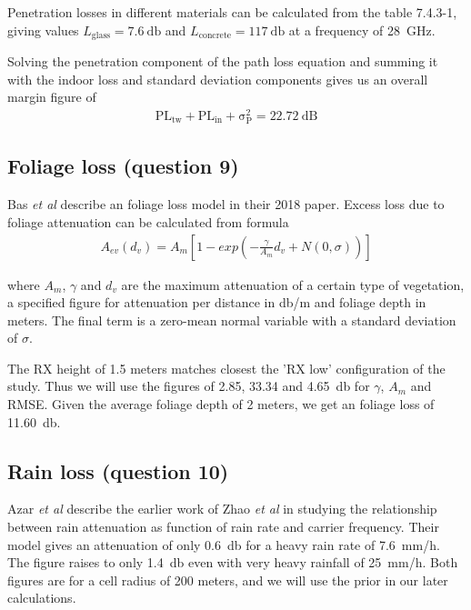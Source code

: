 \documentclass{article}
\begin{document}
Penetration losses in different materials can be calculated from the table 7.4.3-1, giving values \(L_{\mathrm{glass}} = \SI{7.6}{\decibel}\) and \(L_{\mathrm{concrete}} = \SI{117}{\decibel}\) at a frequency of 28\ GHz.

Solving the penetration component of the path loss equation and summing it with the indoor loss and standard deviation components gives us an overall margin figure of
\begin{gather*}
    \mathrm{PL_{tw} + \mathrm{PL_{in} + \sigma^2_P = \SI{22.72}{\deci\bel}}}
\end{gather*}

\subsection{Foliage loss (question 9)}
Bas \textit{et al} describe an foliage loss model in their 2018 paper. Excess loss due to foliage attenuation can be calculated from formula
\begin{gather*}
    A_{ev}(d_v) = A_m [1-exp(-\frac{\gamma}{A_m}d_v + N(0,\sigma))]
\end{gather*}

where \(A_{m}\), \(\gamma\) and \(d_v\) are the maximum attenuation of a certain type of vegetation, a specified figure for attenuation per distance in \si{\decibel / \metre} and foliage depth in meters. The final term is a zero-mean normal variable with a standard deviation of \(\sigma\).

The RX height of 1.5 meters matches closest the 'RX low' configuration of the study. Thus we will use the figures of 2.85, 33.34 and \SI{4.65}{\decibel} for \(\gamma\), \(A_m\) and RMSE. Given the average foliage depth of 2 meters, we get an foliage loss of \SI{11.60}{\decibel}.

\subsection{Rain loss (question 10)}
Azar \textit{et al} describe the earlier work of Zhao \textit{et al} in studying the relationship between rain attenuation as function of rain rate and carrier frequency. Their model gives an attenuation of only \SI{0.6}{\decibel} for a heavy rain rate of \SI{7.6}{\milli\metre / \hour}. The figure raises to only \SI{1.4}{\decibel} even with very heavy rainfall of \SI{25}{\milli\metre / \hour}. Both figures are for a cell radius of 200 meters, and we will use the prior in our later calculations.
\end{document}
